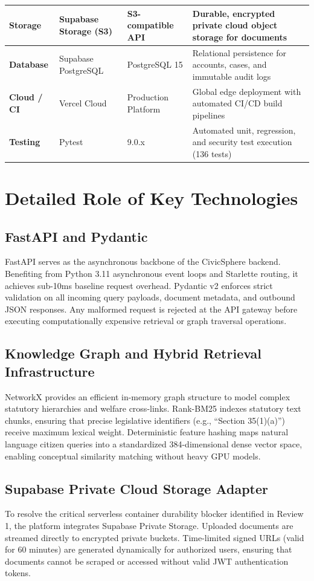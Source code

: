 \begin{table}[H]
{\begin{tabular}{|l|l|p{4cm}|p{5cm}|}
\textbf{Storage} & Supabase Storage (S3) & S3-compatible API & Durable, encrypted private cloud object storage for documents \\ \hline
\textbf{Database} & Supabase PostgreSQL & PostgreSQL 15 & Relational persistence for accounts, cases, and immutable audit logs \\ \hline
\textbf{Cloud / CI} & Vercel Cloud & Production Platform & Global edge deployment with automated CI/CD build pipelines \\ \hline
\textbf{Testing} & Pytest & 9.0.x & Automated unit, regression, and security test execution (136 tests) \\ \hline
\end{tabular}%
}
\end{table}

\section{Detailed Role of Key Technologies}
\label{sec:key_tech_role}

\subsection{FastAPI and Pydantic}
FastAPI serves as the asynchronous backbone of the CivicSphere backend. Benefiting from Python 3.11 asynchronous event loops and Starlette routing, it achieves sub-10ms baseline request overhead. Pydantic v2 enforces strict validation on all incoming query payloads, document metadata, and outbound JSON responses. Any malformed request is rejected at the API gateway before executing computationally expensive retrieval or graph traversal operations.

\subsection{Knowledge Graph and Hybrid Retrieval Infrastructure}
NetworkX provides an efficient in-memory graph structure to model complex statutory hierarchies and welfare cross-links. Rank-BM25 indexes statutory text chunks, ensuring that precise legislative identifiers (e.g., ``Section 35(1)(a)'') receive maximum lexical weight. Deterministic feature hashing maps natural language citizen queries into a standardized 384-dimensional dense vector space, enabling conceptual similarity matching without heavy GPU models.

\subsection{Supabase Private Cloud Storage Adapter}
To resolve the critical serverless container durability blocker identified in Review 1, the platform integrates Supabase Private Storage. Uploaded documents are streamed directly to encrypted private buckets. Time-limited signed URLs (valid for 60 minutes) are generated dynamically for authorized users, ensuring that documents cannot be scraped or accessed without valid JWT authentication tokens.

